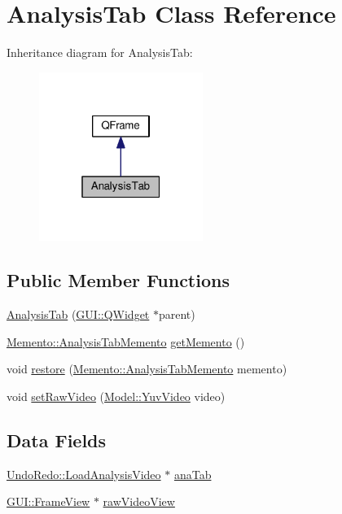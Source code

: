 \hypertarget{classGUI_1_1AnalysisTab}{}\section{Analysis\+Tab Class Reference}
\label{classGUI_1_1AnalysisTab}


Inheritance diagram for Analysis\+Tab\+:
\nopagebreak
\begin{figure}[H]
\begin{center}
\leavevmode
\includegraphics[width=151pt]{classGUI_1_1AnalysisTab__inherit__graph}
\end{center}
\end{figure}
\subsection*{Public Member Functions}
\begin{DoxyCompactItemize}
\item 
\hyperlink{classGUI_1_1AnalysisTab_a34918b6b8bf24eff714545d40bc59090}{Analysis\+Tab} (\hyperlink{classGUI_1_1QWidget}{G\+U\+I\+::\+Q\+Widget} $\ast$parent)
\item 
\hyperlink{classMemento_1_1AnalysisTabMemento}{Memento\+::\+Analysis\+Tab\+Memento} \hyperlink{classGUI_1_1AnalysisTab_ad452524ed628a2eba1f167f79469b829}{get\+Memento} ()
\item 
void \hyperlink{classGUI_1_1AnalysisTab_a37a387e0b6f67a340ff7e60b2f8f7f24}{restore} (\hyperlink{classMemento_1_1AnalysisTabMemento}{Memento\+::\+Analysis\+Tab\+Memento} memento)
\item 
void \hyperlink{classGUI_1_1AnalysisTab_ae01a11c0a081e873c992ebb245295903}{set\+Raw\+Video} (\hyperlink{classModel_1_1YuvVideo}{Model\+::\+Yuv\+Video} video)
\end{DoxyCompactItemize}
\subsection*{Data Fields}
\begin{DoxyCompactItemize}
\item 
\hyperlink{classUndoRedo_1_1LoadAnalysisVideo}{Undo\+Redo\+::\+Load\+Analysis\+Video} $\ast$ \hyperlink{classGUI_1_1AnalysisTab_a3ababc5048f673abd931e7b98eaf0f99}{ana\+Tab}
\item 
\hyperlink{classGUI_1_1FrameView}{G\+U\+I\+::\+Frame\+View} $\ast$ \hyperlink{classGUI_1_1AnalysisTab_a1f4ef1f929a95b39d9446910d47cd32a}{raw\+Video\+View}
\end{DoxyCompactItemize}
